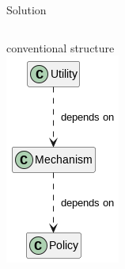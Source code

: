 
\begin{frame}{Solution}
%
\vspace{-9pt}
\begin{columns}
\begin{center}
\small
conventional structure\\
\includegraphics[width=.3\linewidth]{./gfx/17-uml-dependency_injection-violation}


\end{center}
\end{columns}
\end{frame}
